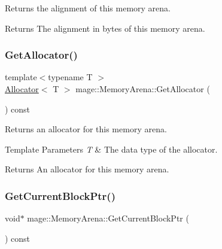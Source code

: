Returns the alignment of this memory arena.

\begin{DoxyReturn}{Returns}
The alignment in bytes of this memory arena. 
\end{DoxyReturn}
\mbox{\label{classmage_1_1_memory_arena_aa2cc5c42ed20c11900330ace3dfcdc8f}} 
\subsubsection{\texorpdfstring{Get\+Allocator()}{GetAllocator()}}
{\footnotesize\ttfamily template$<$typename T $>$ \\
\mbox{\hyperlink{classmage_1_1_memory_arena_1_1_allocator}{Allocator}}$<$ T $>$ mage\+::\+Memory\+Arena\+::\+Get\+Allocator (\begin{DoxyParamCaption}{ }\end{DoxyParamCaption}) const\hspace{0.3cm}{\ttfamily [noexcept]}}

Returns an allocator for this memory arena.


\begin{DoxyTemplParams}{Template Parameters}
{\em T} & The data type of the allocator. \\
\hline
\end{DoxyTemplParams}
\begin{DoxyReturn}{Returns}
An allocator for this memory arena. 
\end{DoxyReturn}
\mbox{\label{classmage_1_1_memory_arena_a7bdbc9da32c1f8d49ce5d2f153870284}} 
\subsubsection{\texorpdfstring{Get\+Current\+Block\+Ptr()}{GetCurrentBlockPtr()}}
{\footnotesize\ttfamily void$\ast$ mage\+::\+Memory\+Arena\+::\+Get\+Current\+Block\+Ptr (\begin{DoxyParamCaption}{ }\end{DoxyParamCaption}) const\hspace{0.3cm}{\ttfamily [noexcept]}}

